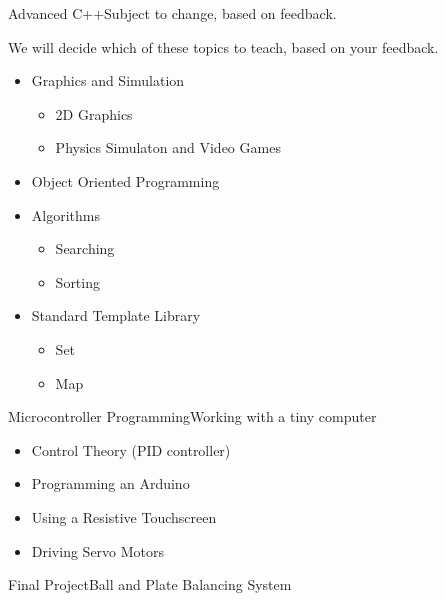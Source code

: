 \begin{frame}{Advanced C++}{Subject to change, based on feedback.}
\begin{block}{}
    We will decide which of these topics to teach, based on your feedback.
\end{block}
\begin{itemize}
    \item Graphics and Simulation
	\begin{itemize}
		\item 2D Graphics
        \item Physics Simulaton and Video Games
	\end{itemize}
	\item Object Oriented Programming
	\item Algorithms
	\begin{itemize}
		\item Searching
        \item Sorting
	\end{itemize}
	\item Standard Template Library
	\begin{itemize}
		\item Set
        \item Map
	\end{itemize}
\end{itemize}
\end{frame}

\begin{frame}{Microcontroller Programming}{Working with a tiny computer}
\begin{itemize}
	\item Control Theory (PID controller)
	\item Programming an Arduino
	\item Using a Resistive Touchscreen
	\item Driving Servo Motors
\end{itemize}
\end{frame}

\begin{frame}{Final Project}{Ball and Plate Balancing System}
\end{frame}
